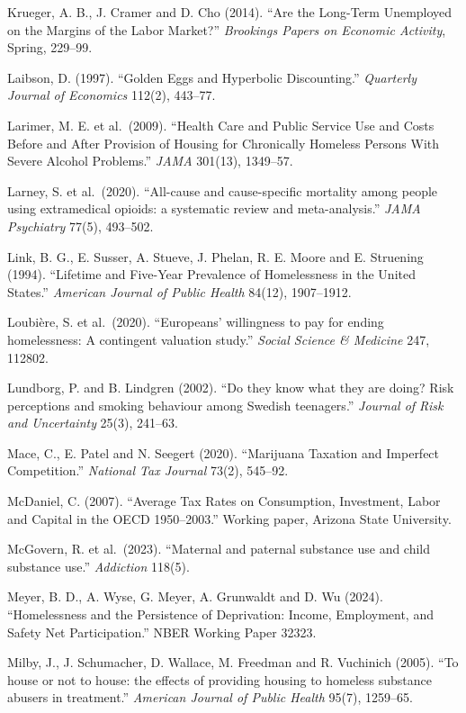 \documentclass[10pt]{article}
\begin{document}
{\begin{list}{}{\setlength{\leftmargin}{1.5em}\setlength{\itemindent}{-1.5em}\setlength{\itemsep}{0.35em}\setlength{\parsep}{0em}}
\item Krueger, A. B., J. Cramer and D. Cho (2014). ``Are the Long-Term Unemployed on the Margins of the Labor Market?'' \emph{Brookings Papers on Economic Activity}, Spring, 229--99.
\item Laibson, D. (1997). ``Golden Eggs and Hyperbolic Discounting.'' \emph{Quarterly Journal of Economics} 112(2), 443--77.
\item Larimer, M. E. et al.\ (2009). ``Health Care and Public Service Use and Costs Before and After Provision of Housing for Chronically Homeless Persons With Severe Alcohol Problems.'' \emph{JAMA} 301(13), 1349--57.
\item Larney, S. et al.\ (2020). ``All-cause and cause-specific mortality among people using extramedical opioids: a systematic review and meta-analysis.'' \emph{JAMA Psychiatry} 77(5), 493--502.
\item Link, B. G., E. Susser, A. Stueve, J. Phelan, R. E. Moore and E. Struening (1994). ``Lifetime and Five-Year Prevalence of Homelessness in the United States.'' \emph{American Journal of Public Health} 84(12), 1907--1912.
\item Loubi\`ere, S. et al.\ (2020). ``Europeans' willingness to pay for ending homelessness: A contingent valuation study.'' \emph{Social Science \& Medicine} 247, 112802.
\item Lundborg, P. and B. Lindgren (2002). ``Do they know what they are doing? Risk perceptions and smoking behaviour among Swedish teenagers.'' \emph{Journal of Risk and Uncertainty} 25(3), 241--63.
\item Mace, C., E. Patel and N. Seegert (2020). ``Marijuana Taxation and Imperfect Competition.'' \emph{National Tax Journal} 73(2), 545--92.
\item McDaniel, C. (2007). ``Average Tax Rates on Consumption, Investment, Labor and Capital in the OECD 1950--2003.'' Working paper, Arizona State University.
\item McGovern, R. et al.\ (2023). ``Maternal and paternal substance use and child substance use.'' \emph{Addiction} 118(5).
\item Meyer, B. D., A. Wyse, G. Meyer, A. Grunwaldt and D. Wu (2024). ``Homelessness and the Persistence of Deprivation: Income, Employment, and Safety Net Participation.'' NBER Working Paper 32323.
\item Milby, J., J. Schumacher, D. Wallace, M. Freedman and R. Vuchinich (2005). ``To house or not to house: the effects of providing housing to homeless substance abusers in treatment.'' \emph{American Journal of Public Health} 95(7), 1259--65.

\end{list}}
\end{document}
